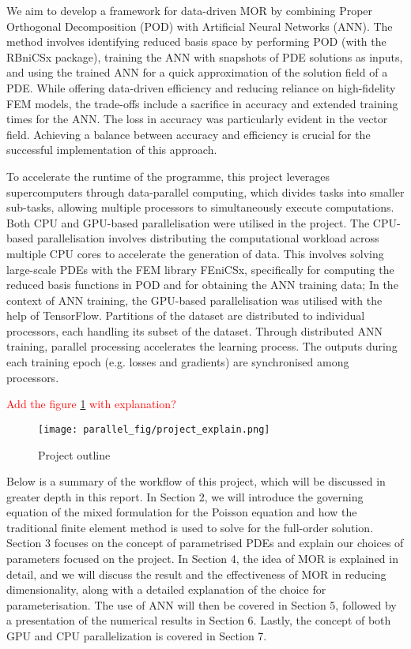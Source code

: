 We aim to develop a framework for data-driven MOR by combining Proper Orthogonal Decomposition (POD) with Artificial Neural Networks (ANN). The method involves identifying reduced basis space by performing POD (with the RBniCSx package), training the ANN with snapshots of PDE solutions as inputs, and using the trained ANN for a quick approximation of the solution field of a PDE. While offering data-driven efficiency and reducing reliance on high-fidelity FEM models, the trade-offs include a sacrifice in accuracy and extended training times for the ANN. The loss in accuracy was particularly evident in the vector field. Achieving a balance between accuracy and efficiency is crucial for the successful implementation of this approach.

To accelerate the runtime of the programme, this project leverages supercomputers through data-parallel computing, which divides tasks into smaller sub-tasks, allowing multiple processors to simultaneously execute computations. Both CPU and GPU-based parallelisation were utilised in the project. The CPU-based parallelisation involves distributing the computational workload across multiple CPU cores to accelerate the generation of data. This involves solving large-scale PDEs with the FEM library FEniCSx, specifically for computing the reduced basis functions in POD and for obtaining the ANN training data; In the context of ANN training, the GPU-based parallelisation was utilised with the help of TensorFlow. Partitions of the dataset are distributed to individual processors, each handling its subset of the dataset. Through distributed ANN training, parallel processing accelerates the learning process. The outputs during each training epoch (e.g. losses and gradients) are synchronised among processors. 

\textcolor{red}{Add the figure \ref{fig:project_explain} with explanation?}

\begin{figure}[!h]
    \centering
    \texttt{[image: parallel\_fig/project\_explain.png]}
    \caption{Project outline}
    \label{fig:project_explain}
\end{figure}

Below is a summary of the workflow of this project, which will be discussed in greater depth in this report. In Section 2, we will introduce the governing equation of the mixed formulation for the Poisson equation and how the traditional finite element method is used to solve for the full-order solution. Section 3 focuses on the concept of parametrised 
PDEs and explain our choices of parameters focused on the project. In Section 4, the idea of MOR is explained in detail, and we will discuss the result and the effectiveness of MOR in reducing dimensionality, along with a detailed explanation of the choice for parameterisation. The use of ANN will then be covered in Section 5, followed by a presentation of the numerical results in Section 6. Lastly, the concept of both GPU and CPU parallelization is covered in Section 7.  

